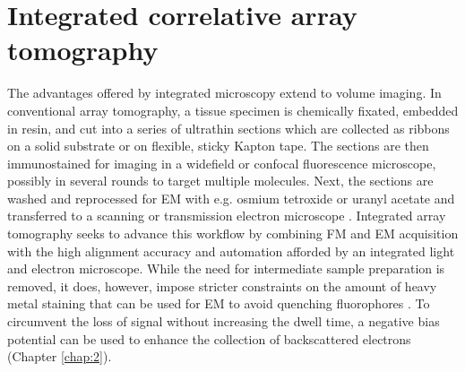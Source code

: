 \section{Integrated correlative array tomography}
\label{sec:1_iCAT}

The advantages offered by integrated microscopy extend to volume imaging. In conventional array tomography, a tissue specimen is chemically fixated, embedded in resin, and cut into a series of ultrathin sections which are collected as ribbons on a solid substrate or on flexible, sticky Kapton tape. The sections are then immunostained for imaging in a widefield or confocal fluorescence microscope, possibly in several rounds to target multiple molecules. Next, the sections are washed and reprocessed for EM with e.g. osmium tetroxide or uranyl acetate and transferred to a scanning or transmission electron microscope \cite{micheva2007array, wacker2013array}. Integrated array tomography seeks to advance this workflow by combining FM and EM acquisition with the high alignment accuracy and automation afforded by an integrated light and electron microscope. While the need for intermediate sample preparation is removed, it does, however, impose stricter constraints on the amount of heavy metal staining that can be used for EM to avoid quenching fluorophores \cite{kuipers2015scanning, peddie2017correlative}. To circumvent the loss of signal without increasing the dwell time, a negative bias potential can be used to enhance the collection of backscattered electrons (Chapter \ref{chap:2}).


